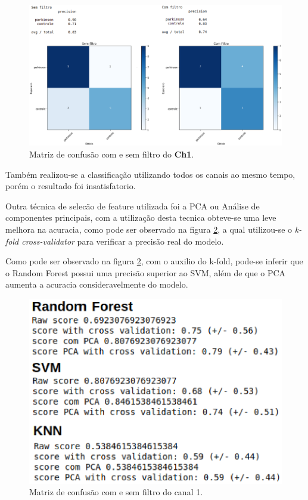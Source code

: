 \begin{figure}[!htb]
	\centering
	\includegraphics[width=1.1\textwidth]{figuras/filtroComp.eps}
	\caption{Matriz de confusão com e sem filtro do \textbf{Ch1}.}
	\label{comesemfiltro}
\end{figure}

Também realizou-se a classificação utilizando todos os canais ao mesmo tempo, porém o resultado foi insatisfatorio.

Outra técnica de selecão de feature utilizada foi a PCA ou Análise de componentes principais, com a utilização desta tecnica obteve-se uma leve melhora na acuracia, como pode ser observado na figura \ref{pcavalidator}, a qual utilizou-se o \textit{k-fold cross-validator} para verificar a precisão real do modelo.

Como pode ser observado na figura \ref{pcavalidator}, com o auxilio do k-fold, pode-se inferir que o Random Forest possui uma precisão superior ao SVM, além de que o PCA aumenta a acuracia consideravelmente do modelo.

\begin{figure}[!htb]
	\centering
	\includegraphics[width=1.1\textwidth]{figuras/modeloComp.eps}
	\caption{Matriz de confusão com e sem filtro do canal 1.}
	\label{pcavalidator}
\end{figure}

